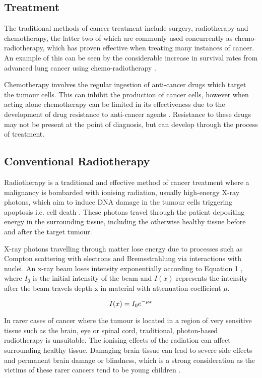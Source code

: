 \documentclass[a4paper, 12pt, conference]
{ieeeconf}      %
\begin{document}
\subsection{Treatment}

The traditional methods of cancer treatment include surgery, radiotherapy and chemotherapy, the latter two of which are commonly used concurrently as chemo-radiotherapy, which has proven effective when treating many instances of cancer. An example of this can be seen by the considerable increase in survival rates from advanced lung cancer using chemo-radiotherapy \cite{chemoradiotherapy}.

Chemotherapy involves the regular ingestion of anti-cancer drugs which target the tumour cells. This can inhibit the production of cancer cells, however when acting alone chemotherapy can be limited in its effectiveness due to the development of drug resistance to anti-cancer agents \cite{chemotherapy}. Resistance to these drugs may not be present at the point of diagnosis, but can develop through the process of treatment.

\subsection{Conventional Radiotherapy}

Radiotherapy is a traditional and effective method of cancer treatment where a malignancy is bombarded with ionising radiation, usually high-energy X-ray photons, which aim to induce DNA damage in the tumour cells triggering apoptosis i.e. cell death \cite{apoptosis}. These photons travel through the patient depositing energy in the surrounding tissue, including the otherwise healthy tissue before and after the target tumour. 

X-ray photons travelling through matter lose energy due to processes such as Compton scattering with electrons and Bremsstrahlung via interactions with nuclei. An x-ray beam loses intensity exponentially according to Equation 1 \cite{photon}, where $I_0$ is the initial intensity of the beam and $I(x)$ represents the intensity after the beam travels depth x in material with attenuation coefficient $\mu$.

\begin{equation}
\begin{centering}
I(x) = I_0 e^{-\mu x}
\end{centering}
\end{equation}


In rarer cases of cancer where the tumour is located in a region of very sensitive tissue such as the brain, eye or spinal cord, traditional, photon-based radiotherapy is unsuitable. The ionising effects of the radiation can affect surrounding healthy tissue. Damaging brain tissue can lead to severe side effects and permanent brain damage or blindness, which is a strong consideration as the victims of these rarer cancers tend to be young children \cite{children}.
\end{document}
